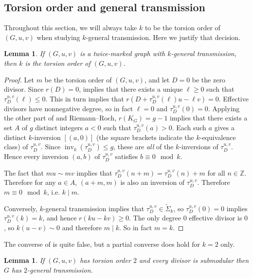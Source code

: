 \documentclass[11pt]{article}
\newtheorem{lemma}[theo]{Lemma}
\theoremstyle{definition}
\numberwithin{equation}{section}
\newcommand{\Z}{\mathbb{Z}}
\newcommand{\inv}{\operatorname{inv}}
\newcommand{\eaf}[1]{\widetilde{\Sigma}_{#1}}
\newcommand{\tauD}{\tau^{u,v}_D}
\begin{document}
\subsection{Torsion order and general transmission}

Throughout this section, we will always take $k$ to be the torsion order of $(G,u,v)$ when studying $k$-general transmission. Here we justify that decision.

\begin{lemma} \label{lem:kgtImpliesTorsionOrder}
If $(G,u,v)$ is a twice-marked graph with $k$-general transmission, then $k$ is the torsion order of $(G,u,v)$.
\end{lemma}
\begin{proof}
Let $m$ be the torsion order of $(G,u,v)$, and let $D = 0$ be the zero divisor. Since $r(D) = 0$,  implies that there exists a unique $\ell \geq 0$ such that $\tauD(\ell) \leq 0$. This in turn implies that $r(D + \tauD(\ell) u - \ell v) = 0$. Effective divisors have nonnegative degree, so in fact $\ell = 0$ and $\tauD(0) = 0$. Applying the other part of  and Riemann--Roch, $r(K_G) = g-1$ implies that there exists a set $A$ of $g$ distinct integers $a < 0$ such that $\tauD(a) > 0$. Each such $a$ gives a distinct $k$-inversion $[(a,0)]$ (the square brackets indicate the $k$-equivalence class) of $\tauD$. Since $\inv_k(\tauD) \leq g$, these are \emph{all} of the $k$-inversions of $\tauD$. Hence every inversion $(a,b)$ of $\tauD$ satisfies $b \equiv 0 \mod k$.

The fact that $mu \sim mv$ implies that $\tauD(n + m) = \tauD(n)+m$ for all $n \in \Z$. Therefore for any $a \in A$, $(a+m,m)$ is also an inversion of $\tauD$. Therefore $m \equiv 0 \mod k$, i.e. $k \mid m$.

Conversely, $k$-general transmission implies that $\tauD \in \eaf{k}$, so $\tauD(0) = 0$ implies $\tauD(k) = k$, and hence $r(ku-kv) \geq 0$. The only degree $0$ effective divisor is $0$, so $k(u-v) \sim 0$ and therefore $m \mid k$. So in fact $m = k$.
\end{proof}

The converse of  is quite false, but a partial converse does hold for $k=2$ only.

\begin{lemma}\label{lem-TO2GenTrans}
    If $(G,u,v)$ has torsion order $2$ and every divisor is submodular then $G$ has $2$-general transmission.
\end{lemma}
\end{document}
